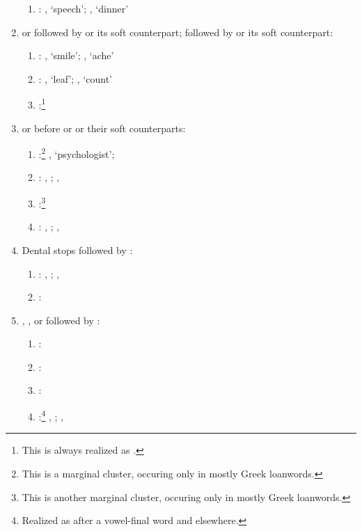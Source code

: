 \begin{enumerate}
\begin{enumerate}
			\item {}:  , `speech';  , `dinner'
		\end{enumerate}
	\item {} or  followed by  or its soft counterpart;  followed by  or its soft counterpart:
		\begin{enumerate}
			\item {}:  , `smile';  , `ache'
			\item {}:  , `leaf';  , `count'
			\item {}:\footnote{This is always realized as .} 
		\end{enumerate}
	\item {} or  before  or  or their soft counterparts:
	\begin{enumerate}
		\item {}:\footnote{This is a marginal cluster, occuring only in mostly Greek loanwords.}  , `psychologist';
		\item {}:  , ;  , 
		\item {}:\footnote{This is another marginal cluster, occuring only in mostly Greek loanwords.} 
		\item {}:  , ;  , 
	\end{enumerate}
	\item Dental stops followed by :
	\begin{enumerate}
		\item {}:  , ;  , 
		\item {}:
	\end{enumerate}
		\item {}, ,  or   followed by :
	\begin{enumerate}
		\item {}:
		\item {}:
		\item {}:
		\item {}:\footnote{Realized as  after a vowel-final word and  elsewhere.}  , ;  , 
	\end{enumerate}


\end{enumerate}
